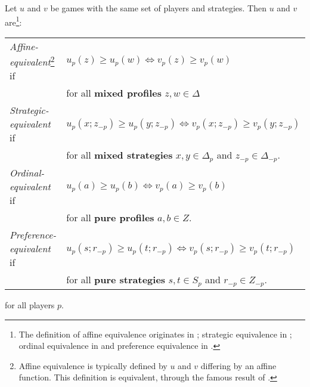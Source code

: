\documentclass[preprint,authoryear]{elsarticle}
\begin{document}
\begin{defn}
    Let $u$ and $v$ be games with the same set of players and strategies. Then $u$ and $v$ are\footnote{The definition of affine equivalence originates in \cite{von2007theory}; strategic equivalence in \cite{moulin1978strategically}; ordinal equivalence in \cite{durieu2008ordinal} and preference equivalence in \cite{biggar_graph_2023}.}:
    \begin{comment}
\begin{compactitem}
    \item \emph{Affine-equivalent}\footnote{Affine equivalence is typically defined by $u$ and $v$ differing by an affine function. This definition is equivalent, through the famous result of \cite{von2007theory}.} if $u_i(z)\geq u_i(w) \Leftrightarrow v_i(z) \geq v_i(w)$ for any player $i$ and \textbf{mixed profiles} $z,w \in \Delta$.
    \item \emph{Strategically equivalent} if $u_i(x;z_{-i}) \geq u_i(y;z_{-i}) \Leftrightarrow v_i(x; z_{-i}) \geq v_i(y; z_{-i})$ for any player $i$, \textbf{mixed strategies} $x,y\in \Delta_i$ and $z_{-i}\in \Delta_{-i}$.
    \item \emph{Ordinal-equivalent} if $u_i(p)\geq u_i(q) \Leftrightarrow v_i(p) \geq v_i(q)$ for any player $i$ and \textbf{pure profiles} $p,q \in Z$.
    \item \emph{Preference-equivalent} if $u_i(s; r_{-i}) \geq u_i(t; r_{-i}) \Leftrightarrow v_i(s; r_{-i}) \geq v_i(t; r_{-i})$ for any player $i$, \textbf{pure strategies} $s,t\in Z_i$ and $r_{-i}\in Z_{-i}$.
\end{compactitem}
\end{comment}

\begin{tabular}{l l}
     \emph{Affine-equivalent}\footnote{Affine equivalence is typically defined by $u$ and $v$ differing by an affine function. This definition is equivalent, through the famous result of \cite{von2007theory}.} if & $u_p(z)\geq u_p(w) \Leftrightarrow v_p(z) \geq v_p(w)$\\ & for all \textbf{mixed profiles} $z,w \in \Delta$\\
    \emph{Strategic-equivalent} if & $u_p(x;z_{-p}) \geq u_p(y;z_{-p}) \Leftrightarrow v_p(x; z_{-p}) \geq v_p(y; z_{-p})$\\ & for all \textbf{mixed strategies} $x,y\in \Delta_p$ and $z_{-p}\in \Delta_{-p}$.\\
    \emph{Ordinal-equivalent} if & $u_p(a)\geq u_p(b) \Leftrightarrow v_p(a) \geq v_p(b)$ \\ & for all \textbf{pure profiles} $a,b \in Z$. \\
    \emph{Preference-equivalent} if & $u_p(s; r_{-p}) \geq u_p(t; r_{-p}) \Leftrightarrow v_p(s; r_{-p}) \geq v_p(t; r_{-p})$\\ & for all \textbf{pure strategies} $s,t\in S_p$ and $r_{-p}\in Z_{-p}$. 
\end{tabular}
for all players $p$.
\end{defn}
\end{document}
